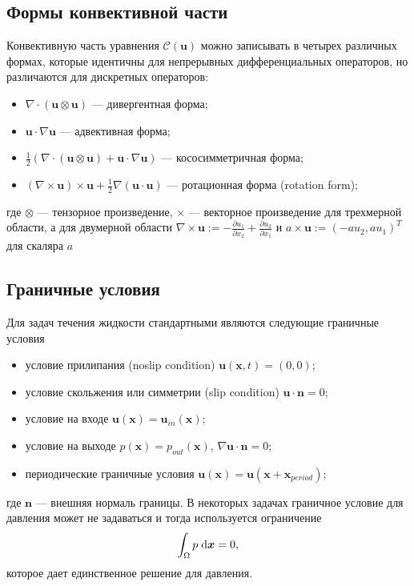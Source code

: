 \documentclass[a4paper,10pt]{report}
\begin{document}
\subsection{Формы конвективной части}

Конвективную часть уравнения $\mathcal{C}(\bm{u})$ можно записывать в четырех различных формах, которые идентичны для непрерывных дифференциальных операторов, но различаются для дискретных операторов:
\begin{itemize}
\item $\nabla \cdot \left(\bm{u} \otimes \bm{u} \right)$ --- дивергентная форма;
\item $\bm{u} \cdot \nabla \bm{u}$ --- адвективная форма;
\item $\frac{1}{2}\left(\nabla \cdot \left(\bm{u} \otimes \bm{u} \right) + \bm{u} \cdot \nabla \bm{u} \right)$ --- кососимметричная форма;
\item $\left( \nabla \times \bm{u} \right) \times \bm{u} + \frac{1}{2} \nabla \left(\bm{u} \cdot \bm{u} \right) $ --- ротационная форма (rotation form);
\end{itemize}
где $\otimes$ --- тензорное произведение, $\times$ --- векторное произведение для трехмерной области, а для двумерной области $\nabla \times \bm{u} := -\frac{\partial u_1}{\partial x_2} + \frac{\partial u_2}{\partial x_1}$ и $a \times \bm{u} := (-a u_2, a u_1)^T$ для скаляра $a$


\subsection{Граничные условия}
Для задач течения жидкости стандартными являются следующие граничные условия
\begin{itemize}
\item условие прилипания (noslip condition) $\bm{u}(\bm{x}, t) = (0, 0)$;
\item условие скольжения или симметрии (slip condition) $\bm{u} \cdot \bm{n} = 0$;
\item условие на входе $\bm{u}(\bm{x}) = \bm{u}_{in}(\bm{x})$;
\item условие на выходе $p(\bm{x}) = p_{out}(\bm{x})$, $\nabla \bm{u} \cdot \bm{n} = 0$;
\item периодические граничные условия $\bm{u}(\bm{x}) = \bm{u}(\bm{x} + \bm{x}_{period})$;
\end{itemize}
где $\bm{n}$ --- внешняя нормаль границы. В некоторых задачах граничное условие для давления может не задаваться и тогда используется ограничение
\[
\int_\Omega p \; {\rm d}\bm{x} = 0,
\]
которое дает единственное решение для давления.
\end{document}

